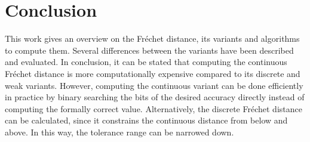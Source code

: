 \documentclass[
oneside,
fontsize=11pt
]{scrartcl}
\begin{document}
\section{Conclusion}
This work gives an overview on the Fréchet distance, 
its variants and algorithms to compute them. 
Several differences between the variants have been described 
and evaluated. 
In conclusion, it can be stated that computing the continuous 
Fréchet distance is more computationally expensive compared 
to its discrete and weak variants.
However, computing the continuous variant can be done efficiently
in practice by binary searching the bits of the desired accuracy directly
instead of computing the formally correct value. 
Alternatively, the discrete Fréchet distance can be calculated, 
since it constrains the continuous distance 
from below and above. 
In this way, the tolerance range can be narrowed down.





\newpage
\appendix  %




\end{document}

